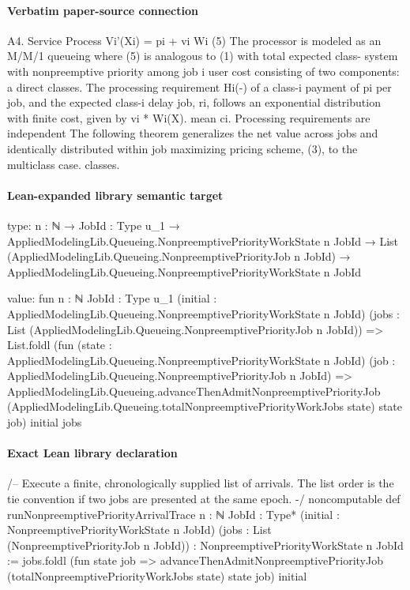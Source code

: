 \documentclass[10pt]{article}
\begin{document}
\paragraph{Verbatim paper-source connection}
\begin{ReviewVerbatim}
A4. Service Process                                                      Vi'(Xi) = pi + vi Wi (5)
The processor is modeled as an M/M/1 queueing                          where (5) is analogous to (1) with total expected class-
system with nonpreemptive priority among job                           i user cost consisting of two components: a direct
classes. The processing requirement Hi(-) of a class-i                 payment of pi per job, and the expected class-i delay
job, ri, follows an exponential distribution with finite cost, given by vi * Wi(X).
mean ci. Processing requirements are independent           The following theorem generalizes the net value
across jobs and identically distributed within job       maximizing pricing scheme, (3), to the multiclass case.
classes.
\end{ReviewVerbatim}



\paragraph{Lean-expanded library semantic target}
\begin{ReviewVerbatim}
type:
{n : ℕ} →
  {JobId : Type u_1} →
    AppliedModelingLib.Queueing.NonpreemptivePriorityWorkState n JobId →
      List (AppliedModelingLib.Queueing.NonpreemptivePriorityJob n JobId) →
        AppliedModelingLib.Queueing.NonpreemptivePriorityWorkState n JobId

value:
fun {n : ℕ} {JobId : Type u_1} (initial : AppliedModelingLib.Queueing.NonpreemptivePriorityWorkState n JobId)
    (jobs : List (AppliedModelingLib.Queueing.NonpreemptivePriorityJob n JobId)) =>
  List.foldl
    (fun (state : AppliedModelingLib.Queueing.NonpreemptivePriorityWorkState n JobId)
        (job : AppliedModelingLib.Queueing.NonpreemptivePriorityJob n JobId) =>
      AppliedModelingLib.Queueing.advanceThenAdmitNonpreemptivePriorityJob
        (AppliedModelingLib.Queueing.totalNonpreemptivePriorityWorkJobs state) state job)
    initial jobs
\end{ReviewVerbatim}

\paragraph{Exact Lean library declaration}
\begin{ReviewVerbatim}
/-- Execute a finite, chronologically supplied list of arrivals.  The list
order is the tie convention if two jobs are presented at the same epoch. -/
noncomputable def runNonpreemptivePriorityArrivalTrace
    {n : ℕ} {JobId : Type*}
    (initial : NonpreemptivePriorityWorkState n JobId)
    (jobs : List (NonpreemptivePriorityJob n JobId)) :
    NonpreemptivePriorityWorkState n JobId :=
  jobs.foldl (fun state job =>
    advanceThenAdmitNonpreemptivePriorityJob
      (totalNonpreemptivePriorityWorkJobs state) state job) initial
\end{ReviewVerbatim}
\end{document}
